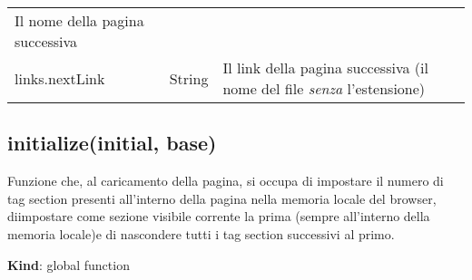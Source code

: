 \begin{longtable}[]{@{}lll@{}}
\begin{minipage}[t]{0.30\columnwidth}
Il nome della pagina successiva\strut
\end{minipage}\tabularnewline
\begin{minipage}[t]{0.30\columnwidth}\raggedright
links.nextLink\strut
\end{minipage} & \begin{minipage}[t]{0.30\columnwidth}\raggedright
String\strut
\end{minipage} & \begin{minipage}[t]{0.30\columnwidth}\raggedright
Il link della pagina successiva (il nome del file \emph{senza}
l'estensione)\strut
\end{minipage}\tabularnewline
\bottomrule
\end{longtable}

\hypertarget{initializeinitial-base-1}{%
\subsection{initialize(initial, base)}\label{initializeinitial-base-1}}

Funzione che, al caricamento della pagina, si occupa di impostare il
numero di tag section presenti all'interno della pagina nella memoria
locale del browser, diimpostare come sezione visibile corrente la prima
(sempre all'interno della memoria locale)e di nascondere tutti i tag
section successivi al primo.

\textbf{Kind}: global function

